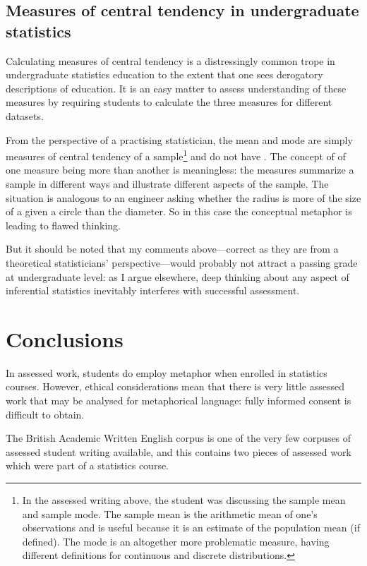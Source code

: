 \subsection{Measures of central tendency in undergraduate statistics}

Calculating measures of central tendency is a distressingly common
trope in undergraduate statistics education to the extent that one
sees derogatory descriptions of  education.
It is an easy matter to assess understanding of these measures by
requiring students to calculate the three measures for different
datasets.

From the perspective of a practising statistician, the mean and mode
are simply measures of central tendency of a sample\footnote{In the
  assessed writing above, the student was discussing the sample mean
  and sample mode.  The sample mean is the arithmetic mean of one's
  observations and is useful because it is an estimate of the
  population mean (if defined).  The mode is an altogether more
  problematic measure, having different definitions for continuous and
  discrete distributions.} and do not have .  The
concept of of one measure being more  than
another is meaningless: the measures summarize a sample in different
ways and illustrate different aspects of the sample.  The situation is
analogous to an engineer asking whether the radius is more
 of the size of a given a circle than the
diameter.  So in this case the conceptual metaphor  is leading to flawed thinking.

But it should be noted that my comments above---correct as they are
from a theoretical statisticians' perspective---would probably not
attract a passing grade at undergraduate level: as I argue elsewhere,
deep thinking about any aspect of inferential statistics inevitably
interferes with successful assessment.

\section{Conclusions}

In assessed work, students do employ metaphor when enrolled in
statistics courses.  However, ethical considerations mean that there
is very little assessed work that may be analysed for metaphorical
language: fully informed consent is difficult to obtain.

The British Academic Written English corpus is one of the very few
corpuses of assessed student writing available, and this contains two
pieces of assessed work which were part of a statistics course.

